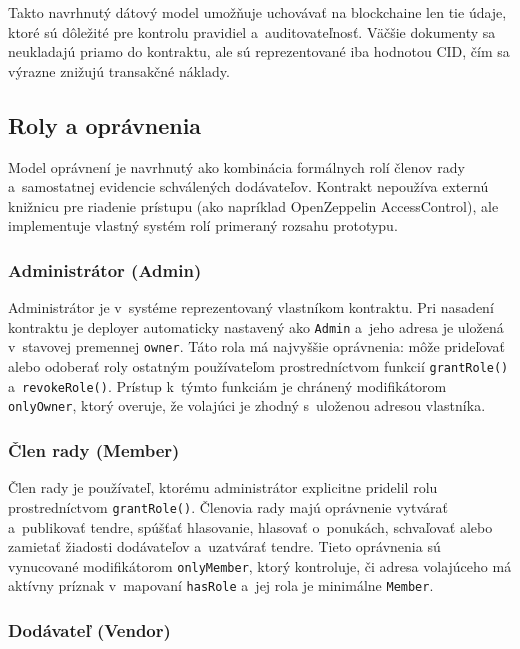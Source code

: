 Takto navrhnutý dátový model umožňuje uchovávať na blockchaine len tie údaje,
ktoré sú dôležité pre kontrolu pravidiel a~auditovateľnosť. Väčšie dokumenty
sa neukladajú priamo do kontraktu, ale sú reprezentované iba hodnotou CID,
čím sa výrazne znižujú transakčné náklady.

\subsection{Roly a oprávnenia}
\label{subsec:roles}

Model oprávnení je navrhnutý ako kombinácia formálnych rolí členov rady
a~samostatnej evidencie schválených dodávateľov. Kontrakt nepoužíva externú
knižnicu pre riadenie prístupu (ako napríklad OpenZeppelin AccessControl), ale
implementuje vlastný systém rolí primeraný rozsahu prototypu.

\subsubsection{Administrátor (Admin)}

Administrátor je v~systéme reprezentovaný vlastníkom kontraktu. Pri nasadení
kontraktu je deployer automaticky nastavený ako \texttt{Admin}
a~jeho adresa je uložená v~stavovej premennej \texttt{owner}. Táto rola
má najvyššie oprávnenia: môže prideľovať alebo odoberať roly ostatným
používateľom prostredníctvom funkcií \texttt{grantRole()} a~\texttt{revokeRole()}.
Prístup k~týmto funkciám je chránený modifikátorom \texttt{onlyOwner},
ktorý overuje, že volajúci je zhodný s~uloženou adresou vlastníka.

\subsubsection{Člen rady (Member)}

Člen rady je používateľ, ktorému administrátor explicitne pridelil rolu
prostredníctvom \texttt{grantRole()}. Členovia rady majú oprávnenie vytvárať
a~publikovať tendre, spúšťať hlasovanie, hlasovať o~ponukách, schvaľovať
alebo zamietať žiadosti dodávateľov a~uzatvárať tendre. Tieto oprávnenia
sú vynucované modifikátorom \texttt{onlyMember}, ktorý kontroluje, či
adresa volajúceho má aktívny príznak v~mapovaní \texttt{hasRole} a~jej rola
je minimálne \texttt{Member}.

\subsubsection{Dodávateľ (Vendor)}

